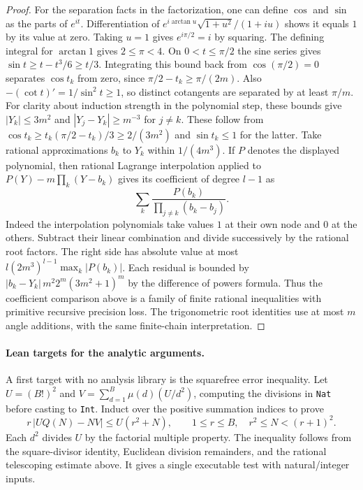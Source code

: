 \begin{proof}
For the separation facts in the factorization, one can define
$\cos$ and $\sin$ as the parts of $e^{it}$. Differentiation of
$e^{i\arctan u}\sqrt{1+u^2}/(1+iu)$ shows it equals $1$ by its
value at zero. Taking $u=1$ gives $e^{i\pi/2}=i$ by squaring.
The defining integral for $\arctan 1$ gives $2\le\pi<4$.
On $0<t\le\pi/2$ the sine series gives
$\sin t\ge t-t^3/6\ge t/3$. Integrating this bound back from
$\cos(\pi/2)=0$ separates $\cos t_k$ from zero, since
$\pi/2-t_k\ge\pi/(2m)$. Also $-(\cot t)'=1/\sin^2t\ge1$,
so distinct cotangents are separated by at least $\pi/m$.
For clarity about induction strength in the polynomial step, these
bounds give $|Y_k|\le3m^2$ and $|Y_j-Y_k|\ge m^{-3}$ for $j\ne k$. These follow from
$\cos t_k\ge t_k(\pi/2-t_k)/3\ge 2/(3m^2)$ and $\sin t_k\le1$
for the latter. Take rational approximations $b_k$ to $Y_k$ within
$1/(4m^3)$. If $P$ denotes the displayed polynomial, then rational
Lagrange interpolation applied to $P(Y)-m\prod_k(Y-b_k)$ gives its
coefficient of degree $l-1$ as
\[
             \sum_k \frac{P(b_k)}{\prod_{j\ne k}(b_k-b_j)}.
\]
Indeed the interpolation polynomials take values $1$ at their own node
and $0$ at the others. Subtract their linear combination and divide
successively by the rational root factors. The right side has absolute
value at most $l(2m^3)^{l-1}\max_k|P(b_k)|$. Each residual is
bounded by $|b_k-Y_k|\,m^2 2^m(3m^2+1)^m$ by the difference of
powers formula. Thus the coefficient comparison above is a family of
finite rational inequalities with primitive recursive precision loss.
The trigonometric root identities use at most $m$ angle additions,
with the same finite-chain interpretation.
\end{proof}

\paragraph{Lean targets for the analytic arguments.}
A first target with no analysis library is the squarefree error
inequality. Let $U=(B!)^2$ and $V=\sum_{d=1}^B\mu(d)(U/d^2)$,
computing the divisions in \texttt{Nat} before casting to
\texttt{Int}. Induct over the positive summation indices to prove
\[
          r\,|UQ(N)-NV|\le U(r^2+N),\qquad 1\le r\le B,
          \quad r^2\le N<(r+1)^2.
\]
Each $d^2$ divides $U$ by the factorial multiple property. The
inequality follows from the square-divisor identity, Euclidean
division remainders, and the rational telescoping estimate above.
It gives a single executable test with natural/integer inputs.

